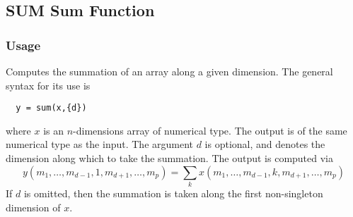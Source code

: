 %
%
%
\subsection{SUM Sum Function}
\subsubsection{Usage}
Computes the summation of an array along a given dimension.  The general
syntax for its use is
\begin{verbatim}
  y = sum(x,{d})
\end{verbatim}
where $x$ is an $n$-dimensions array of numerical type.
The output is of the same numerical type as the input.  The argument
$d$ is optional, and denotes the dimension along which to take
the summation.  The output is computed via
\[
y(m_1,\ldots,m_{d-1},1,m_{d+1},\ldots,m_{p}) = 
\sum_{k} x(m_1,\ldots,m_{d-1},k,m_{d+1},\ldots,m_{p})
\]
If $d$ is omitted, then the summation is taken along the 
first non-singleton dimension of $x$. 
